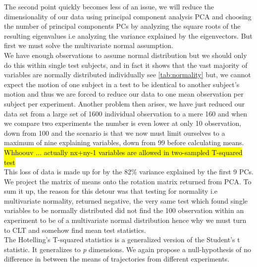 \documentclass{article}
\begin{document}
The second point quickly becomes less of an issue, we will reduce the dimensionality of our data using principal component analysis PCA and choosing the number of principal components PCs by analyzing the square roots of the resulting eigenvalues i.e analyzing the variance explained by the eigenvectors. But first we must solve the multivariate normal assumption. \\
 We have enough observations to assume normal distribution but we should only do this within single test subjects, and in fact it shows that the vast majority of variables are normally distributed individually see \ref{tab:normality} but, we cannot expect the motion of one subject in a test to be identical to another subject's motion and thus we are forced to reduce our data to one mean observation per subject per experiment. Another problem then arises, we have just reduced our data set from a large set of 1600 individual observation to a mere 160 and when we compare two experiments the number is even lower at only 10 observation, down from 100 and the scenario is that we now must limit ourselves to a maximum of nine explaining variables, down from 99 before calculating means. \hl{Whhoouv ... actually nx+ny-1 variables are allowed in two-sampled T-squared test}\\
 This loss of data is made up for by the 82\% variance explained by the first 9 PCs. We project the matrix of means onto the rotation matrix returned from PCA. To sum it up, the reason for this detour was that testing for normality i.e multivariate normality, returned negative, the very same test which found single variables to be normally distributed did not find the 100 observation within an experiment to be of a multivariate normal distribution hence why we must turn to CLT and somehow find mean test statistics.\\
The Hotelling's T-squared statistics is a generalized version of the Student's t statistic. It generalizes to \textit{p} dimensions. We again propose a null-hypothesis of no difference in between the means of trajectories from different experiments. 


\end{document}
